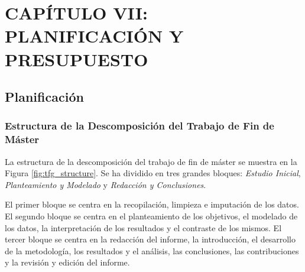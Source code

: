 \section{CAPÍTULO VII: PLANIFICACIÓN Y PRESUPUESTO}\label{cap:results}

\subsection{Planificación}\label{sec:planificacion}

\subsubsection{Estructura de la Descomposición del Trabajo de Fin de Máster}\label{sec:edt}

La estructura de la descomposición del trabajo de fin de máster se muestra en la Figura \ref{fig:tfg_structure}. Se ha dividido en tres grandes bloques: \textit{Estudio Inicial}, \textit{Planteamiento y Modelado} y \textit{Redacción y Conclusiones}. 

El primer bloque se centra en la recopilación, limpieza e imputación de los datos. El segundo bloque se centra en el planteamiento de los objetivos, el modelado de los datos, la interpretación de los resultados y el contraste de los mismos. El tercer bloque se centra en la redacción del informe, la introducción, el desarrollo de la metodología, los resultados y el análisis, las conclusiones, las contribuciones y la revisión y edición del informe.

